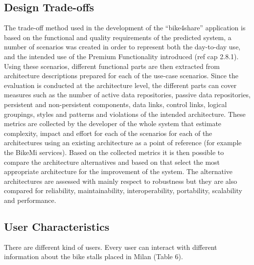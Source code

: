 \documentclass{article}
\begin{document}
\subsection{ Design Trade-offs}
The trade-off method used in the development of the “bike4share” application is based on the functional and quality requirements of the predicted system, a number of scenarios was created in order to  represent both the day-to-day use, and the intended use of the Premium  Functionality introduced (ref cap 2.8.1). 
Using these scenarios, different functional parts are then extracted from architecture descriptions prepared for each of the use-case scenarios. Since the evaluation is conducted at the architecture level, the different parts can cover measures such as the number of active data repositories, passive data repositories, persistent and non-persistent components, data links, control links, logical groupings, styles and patterns and violations of the intended architecture. These metrics are collected by the developer of the whole system that estimate complexity, impact and effort for each of the scenarios for each of the architectures using an existing architecture as a point of reference (for example the BikeMi services). Based on the collected metrics it is then possible to compare the architecture alternatives and based on that select the most appropriate architecture for the improvement of the system. The alternative architectures are assessed with mainly respect to robustness but they are also compared for reliability, maintainability, interoperability, portability, scalability and performance.

\subsection{User Characteristics}
There are different kind of users. Every user can interact with different information about the bike stalls placed in Milan (Table 6). 
\end{document}
